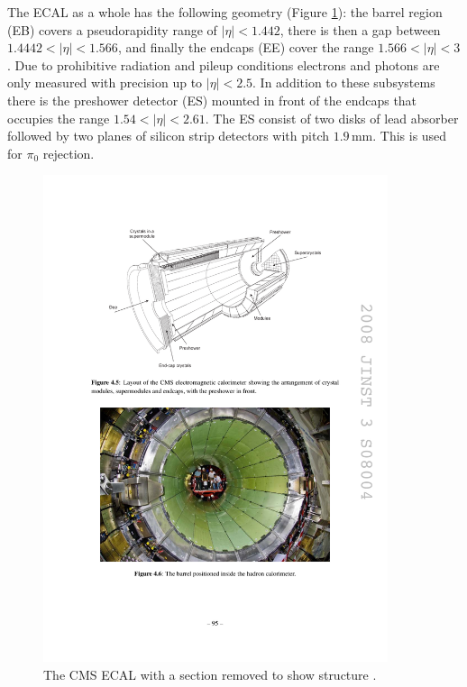 The ECAL as a whole has the following geometry (Figure \ref{fig:apparatus:ecal}): the barrel region (EB) covers a pseudorapidity range of $|\eta|<1.442$, there is then a gap between $1.4442<|\eta|<1.566$, and finally the endcaps (EE) cover the range $1.566<|\eta|<3$. Due to prohibitive radiation and pileup conditions electrons and photons are only measured with precision up to $|\eta|<2.5$. 
In addition to these subsystems there is the preshower detector (ES) mounted in front of the endcaps that occupies the range $1.54<|\eta|<2.61$. The ES consist of two disks of lead absorber followed by two planes of silicon strip detectors with pitch $1.9$\,mm. This is used for $\pi_{0}$ rejection. 
\begin{figure}[h!]
    \centering
    \includegraphics[width=0.9\textwidth]{figures/apparatus/ECAL_alt.pdf}
    \caption{The CMS ECAL with a section removed to show structure \cite{CMSatLHC}.}
    \label{fig:apparatus:ecal}
\end{figure}

